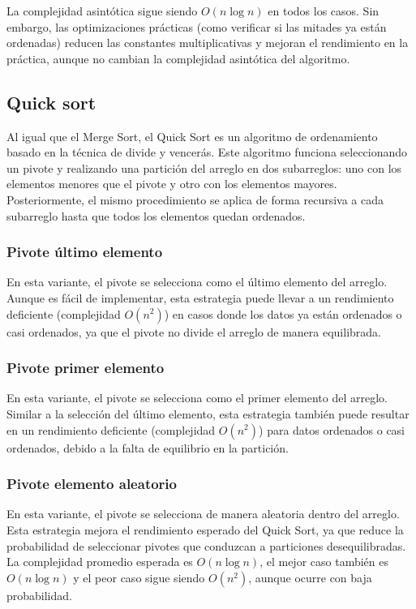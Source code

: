 La complejidad asintótica sigue siendo \(O(n \log n)\) en todos los casos. Sin embargo, las optimizaciones prácticas (como verificar si las mitades ya están ordenadas) reducen las constantes multiplicativas y mejoran el rendimiento en la práctica, aunque no cambian la complejidad asintótica del algoritmo.

\subsection{Quick sort}
Al igual que el Merge Sort, el Quick Sort es un algoritmo de ordenamiento basado en la técnica de divide y vencerás.
Este algoritmo funciona seleccionando un pivote y realizando una partición del arreglo en dos subarreglos: uno con los elementos menores que el pivote y otro con los elementos mayores. Posteriormente, el mismo procedimiento se aplica de forma recursiva a cada subarreglo hasta que todos los elementos quedan ordenados.

\subsubsection{Pivote último elemento}
En esta variante, el pivote se selecciona como el último elemento del arreglo. Aunque es fácil de implementar, esta estrategia puede llevar a un rendimiento deficiente (complejidad \(O(n^2)\)) en casos donde los datos ya están ordenados o casi ordenados, ya que el pivote no divide el arreglo de manera equilibrada.

\subsubsection{Pivote primer elemento}
En esta variante, el pivote se selecciona como el primer elemento del arreglo. Similar a la selección del último elemento, esta estrategia también puede resultar en un rendimiento deficiente (complejidad \(O(n^2)\)) para datos ordenados o casi ordenados, debido a la falta de equilibrio en la partición.

\subsubsection{Pivote elemento aleatorio}
En esta variante, el pivote se selecciona de manera aleatoria dentro del arreglo. Esta estrategia mejora el rendimiento esperado del Quick Sort, ya que reduce la probabilidad de seleccionar pivotes que conduzcan a particiones desequilibradas. La complejidad promedio esperada es \(O(n \log n)\), el mejor caso también es \(O(n \log n)\) y el peor caso sigue siendo \(O(n^2)\), aunque ocurre con baja probabilidad.

